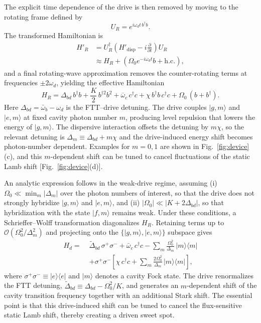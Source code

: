 The explicit time dependence of the drive is then removed by moving to the rotating frame defined by
\begin{equation}
U_R=e^{i\omega_d t\, b^\dagger b}.
\end{equation}
The transformed Hamiltonian is
\begin{align}
H'_R
&= U_R^\dagger\left(H'_{\mathrm{disp}}-i\frac{\partial}{\partial t}\right)U_R
\nonumber\\
&\approx H_R+\left(\Omega_0 e^{-i\omega_d t}b+\mathrm{h.c.}\right),
\end{align}
and a final rotating-wave approximation removes the counter-rotating terms at frequencies $\pm 2\omega_d$, yielding the effective Hamiltonian 
\begin{equation}
\label{eq:H_R_floquet}
H_R =
\Delta_{bd}\, b^\dagger b
+ \frac{K}{2}\, b^{\dagger 2} b^{2}
+ \overline{\omega}_c\, c^\dagger c
+ \chi\, b^\dagger b\, c^\dagger c
+ \Omega_0\, ( b + b^\dagger ).
\end{equation}
Here $\Delta_{bd}=\bar{\omega}_b-\omega_d$ is the FTT--drive detuning. The drive couples $|g,m\rangle$ and $|e,m\rangle$ at fixed cavity photon number $m$, producing level repulsion that lowers the energy of $|g,m\rangle$. The dispersive interaction offsets the detuning by $m\chi$, so the relevant detuning is $\Delta_m \equiv \Delta_{bd}+m\chi$ and the drive-induced energy shift becomes photon-number dependent. Examples for $m=0,1$ are shown in Fig.~\ref{fig:device}(c), and this $m$-dependent shift can be tuned to cancel fluctuations of the static Lamb shift [Fig.~\ref{fig:device}(d)].

An analytic expression follows in the weak-drive regime, assuming (i) $\Omega_0 \ll \min_m|\Delta_m|$ over the photon numbers of interest, so that the drive does not strongly hybridize $|g,m\rangle$ and $|e,m\rangle$, and (ii) $|\Omega_0|\ll |K+2\Delta_{bd}|$, so that hybridization with the state $|f,m\rangle$ remains weak. Under these conditions, a Schrieffer--Wolff transformation diagonalizes $H_R$. Retaining terms up to $\mathcal{O}(\Omega_0^2/\Delta_m^2)$ and projecting onto the $\{|g,m\rangle,|e,m\rangle\}$ subspace gives
\begin{equation}
\label{eq:mainHd_two_level}
\begin{aligned}
H_d =\;&
\widetilde{\Delta}_{bd}\,\sigma^+\sigma^-
+\bar\omega_c\,c^\dagger c
-\sum_m \frac{\Omega_0^2}{\Delta_m}\,|m\rangle\langle m|
\\
&+\sigma^+\sigma^-\!\left[
\chi\,c^\dagger c
+\sum_m \frac{2\Omega_0^2}{\Delta_m}\,|m\rangle\langle m|
\right],
\end{aligned}
\end{equation}
where $\sigma^+\sigma^- \equiv |e\rangle\langle e|$ and $|m\rangle$ denotes a cavity Fock state. The drive renormalizes the FTT detuning, $\widetilde{\Delta}_{bd}\equiv \Delta_{bd}-\Omega_0^2/K$, and generates an $m$-dependent shift of the cavity transition frequency together with an additional Stark shift. The essential point is that this drive-induced shift can be tuned to cancel the flux-sensitive static Lamb shift, thereby creating a driven sweet spot.

